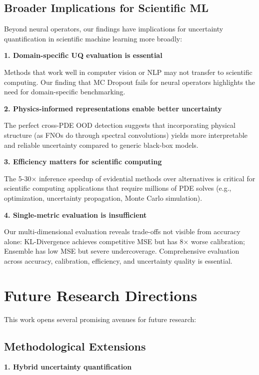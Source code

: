 \subsection{Broader Implications for Scientific ML}

Beyond neural operators, our findings have implications for uncertainty quantification in scientific machine learning more broadly:

\textbf{1. Domain-specific UQ evaluation is essential}

Methods that work well in computer vision or NLP may not transfer to scientific computing. Our finding that MC Dropout fails for neural operators highlights the need for domain-specific benchmarking.

\textbf{2. Physics-informed representations enable better uncertainty}

The perfect cross-PDE OOD detection suggests that incorporating physical structure (as FNOs do through spectral convolutions) yields more interpretable and reliable uncertainty compared to generic black-box models.

\textbf{3. Efficiency matters for scientific computing}

The 5-30× inference speedup of evidential methods over alternatives is critical for scientific computing applications that require millions of PDE solves (e.g., optimization, uncertainty propagation, Monte Carlo simulation).

\textbf{4. Single-metric evaluation is insufficient}

Our multi-dimensional evaluation reveals trade-offs not visible from accuracy alone: KL-Divergence achieves competitive MSE but has 8× worse calibration; Ensemble has low MSE but severe undercoverage. Comprehensive evaluation across accuracy, calibration, efficiency, and uncertainty quality is essential.

\section{Future Research Directions}

This work opens several promising avenues for future research:

\subsection{Methodological Extensions}

\textbf{1. Hybrid uncertainty quantification}

